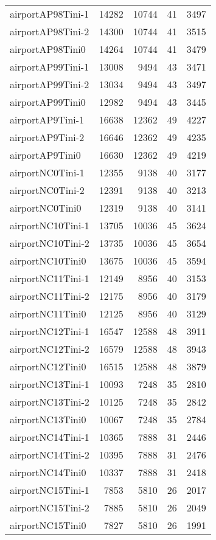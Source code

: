 \begin{longtable}{lrrrr}
airportAP98Tini-1 & 14282 & 10744 & 41 & 3497 \\
airportAP98Tini-2 & 14300 & 10744 & 41 & 3515 \\
airportAP98Tini0 & 14264 & 10744 & 41 & 3479 \\
airportAP99Tini-1 & 13008 & 9494 & 43 & 3471 \\
airportAP99Tini-2 & 13034 & 9494 & 43 & 3497 \\
airportAP99Tini0 & 12982 & 9494 & 43 & 3445 \\
airportAP9Tini-1 & 16638 & 12362 & 49 & 4227 \\
airportAP9Tini-2 & 16646 & 12362 & 49 & 4235 \\
airportAP9Tini0 & 16630 & 12362 & 49 & 4219 \\
airportNC0Tini-1 & 12355 & 9138 & 40 & 3177 \\
airportNC0Tini-2 & 12391 & 9138 & 40 & 3213 \\
airportNC0Tini0 & 12319 & 9138 & 40 & 3141 \\
airportNC10Tini-1 & 13705 & 10036 & 45 & 3624 \\
airportNC10Tini-2 & 13735 & 10036 & 45 & 3654 \\
airportNC10Tini0 & 13675 & 10036 & 45 & 3594 \\
airportNC11Tini-1 & 12149 & 8956 & 40 & 3153 \\
airportNC11Tini-2 & 12175 & 8956 & 40 & 3179 \\
airportNC11Tini0 & 12125 & 8956 & 40 & 3129 \\
airportNC12Tini-1 & 16547 & 12588 & 48 & 3911 \\
airportNC12Tini-2 & 16579 & 12588 & 48 & 3943 \\
airportNC12Tini0 & 16515 & 12588 & 48 & 3879 \\
airportNC13Tini-1 & 10093 & 7248 & 35 & 2810 \\
airportNC13Tini-2 & 10125 & 7248 & 35 & 2842 \\
airportNC13Tini0 & 10067 & 7248 & 35 & 2784 \\
airportNC14Tini-1 & 10365 & 7888 & 31 & 2446 \\
airportNC14Tini-2 & 10395 & 7888 & 31 & 2476 \\
airportNC14Tini0 & 10337 & 7888 & 31 & 2418 \\
airportNC15Tini-1 & 7853 & 5810 & 26 & 2017 \\
airportNC15Tini-2 & 7885 & 5810 & 26 & 2049 \\
airportNC15Tini0 & 7827 & 5810 & 26 & 1991 \\

\end{longtable}
